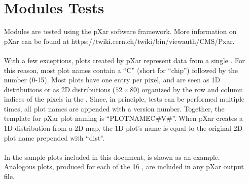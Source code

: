 \section{Modules Tests}
\label{s:tests}

Modules are tested using the pXar software framework.  
More information on pXar can be found at https://twiki.cern.ch/twiki/bin/viewauth/CMS/Pxar.
\\\\
With a few exceptions, plots created by pXar represent data from a single \roc.
For this reason, most plot names contain a ``C'' (short for ``chip'') followed by the \roc number (0-15).
Most \roc plots have one entry per pixel, and are seen as 1D distributions
or as 2D distributions ($52\times80$) organized by the row and column indices of the pixels in the \roc.
Since, in principle, tests can be performed multiple times, all plot names are appended with a version number.
Together, the template for pXar plot naming is ``PLOT\textunderscore NAME\textunderscore C\#\textunderscore V\#''.
When pXar creates a 1D distribution from a 2D \roc map,  
the 1D plot's name is equal to the original 2D plot name prepended with ``dist\textunderscore''.
\\\\
In the sample plots included in this document,  is shown as an example.
Analogous plots, produced for each of the 16 \rocs, are included in any pXar output file.




















